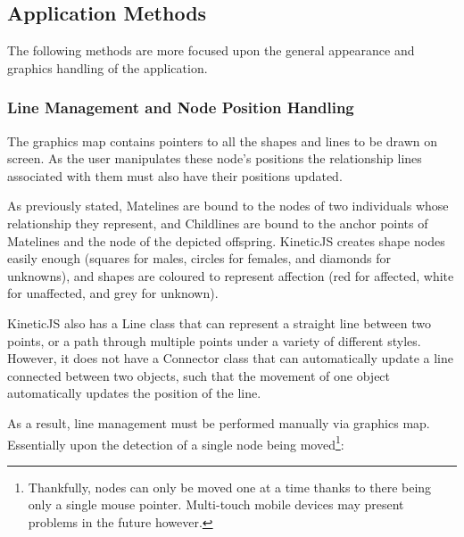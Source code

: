 \subsection{Application Methods}

The following methods are more focused upon the general appearance and graphics handling of the application.

\subsubsection{Line Management and Node Position Handling}

The graphics map contains pointers to all the shapes and lines to be drawn on screen. As the user manipulates these node's positions the relationship lines associated with them must also have their positions updated.

As previously stated,  Matelines are bound to the nodes of two individuals whose relationship they represent, and Childlines are bound to the anchor points of Matelines and the node of the depicted offspring.
KineticJS creates shape nodes easily enough (squares for males, circles for females, and diamonds for unknowns), and shapes are coloured to represent affection (red for affected, white for unaffected, and grey for unknown).

KineticJS also has a Line class that can represent a straight line between two points, or a path through multiple points under a variety of different styles. However, it does not have a Connector class that can automatically update a line connected between two objects, such that the movement of one object automatically updates the position of the line.

As a result, line management must be performed manually via graphics map. Essentially upon the detection of a single node being moved\footnote{Thankfully, nodes can only be moved one at a time thanks to there being only a single mouse pointer. Multi-touch mobile devices may present problems in the future however.}:

\begin{enumerate}
\end{enumerate}


